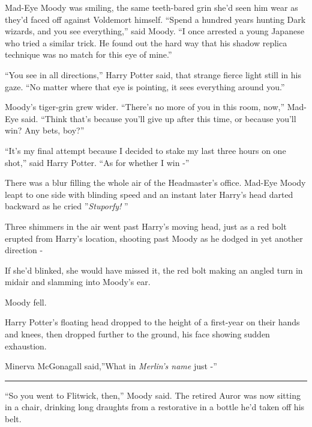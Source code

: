 Mad-Eye Moody was smiling, the same teeth-bared grin she'd seen him wear
as they'd faced off against Voldemort himself. ``Spend a hundred years
hunting Dark wizards, and you see everything,'' said Moody. ``I once
arrested a young Japanese who tried a similar trick. He found out the
hard way that his shadow replica technique was no match for this eye of
mine.''

``You see in all directions,'' Harry Potter said, that strange fierce
light still in his gaze. ``No matter where that eye is pointing, it sees
everything around you.''

Moody's tiger-grin grew wider. ``There's no more of you in this room,
now,'' Mad-Eye said. ``Think that's because you'll give up after this
time, or because you'll win? Any bets, boy?''

``It's my final attempt because I decided to stake my last three hours
on one shot,'' said Harry Potter. ``As for whether I win -''

There was a blur filling the whole air of the Headmaster's office.
Mad-Eye Moody leapt to one side with blinding speed and an instant later
Harry's head darted backward as he cried ''\emph{Stuporfy!} ''

Three shimmers in the air went past Harry's moving head, just as a red
bolt erupted from Harry's location, shooting past Moody as he dodged in
yet another direction -

If she'd blinked, she would have missed it, the red bolt making an
angled turn in midair and slamming into Moody's ear.

Moody fell.

Harry Potter's floating head dropped to the height of a first-year on
their hands and knees, then dropped further to the ground, his face
showing sudden exhaustion.

Minerva McGonagall said,''What in \emph{Merlin's name} just -''

\begin{center}\rule{3in}{0.4pt}\end{center}

``So you went to Flitwick, then,'' Moody said. The retired Auror was now
sitting in a chair, drinking long draughts from a restorative in a
bottle he'd taken off his belt.

